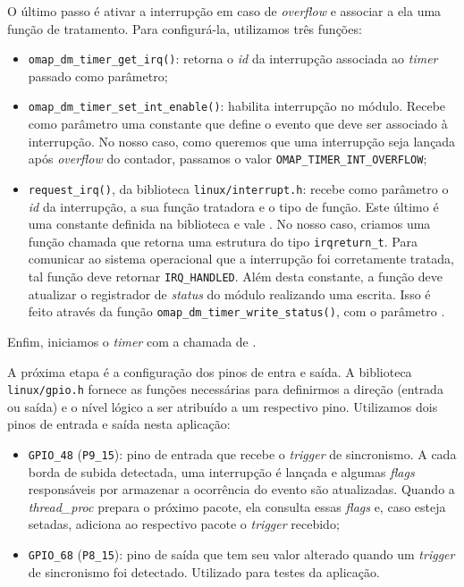 O último passo é ativar a interrupção em caso de \textit{overflow} e associar a
ela uma função de tratamento. Para configurá-la, utilizamos três funções:

\begin{itemize} \renewcommand\labelitemi{--}
  \item \texttt{omap\_dm\_timer\_get\_irq()}: retorna o \textit{id} da
  interrupção associada ao \textit{timer} passado como parâmetro;

  \item \texttt{omap\_dm\_timer\_set\_int\_enable()}: habilita interrupção no
  módulo. Recebe como parâmetro uma constante que define o evento que deve ser
  associado à interrupção. No nosso caso, como queremos que uma interrupção seja
  lançada após \textit{overflow} do contador, passamos o valor
  \texttt{OMAP\_TIMER\_INT\_OVERFLOW};

  \item \texttt{request\_irq()}, da biblioteca \texttt{linux/interrupt.h}:
  recebe como parâmetro o \textit{id} da interrupção, a sua função tratadora e
  o tipo de função. Este último é uma constante definida na biblioteca e vale
  . No nosso caso, criamos uma função chamada
   que retorna uma estrutura do tipo \texttt{irqreturn\_t}. Para comunicar ao sistema
  operacional que a interrupção foi corretamente tratada, tal função deve
  retornar \texttt{IRQ\_HANDLED}. Além desta constante, a função deve atualizar
  o registrador de \textit{status} do módulo realizando uma escrita. Isso é
  feito através da função \texttt{omap\_dm\_timer\_write\_status()}, com o
  parâmetro .
\end{itemize}
 
Enfim, iniciamos o \textit{timer} com a chamada de .

\vspace{12pt}

A próxima etapa é a configuração dos pinos de entra e saída. A biblioteca
\texttt{linux/gpio.h} fornece as funções necessárias para definirmos a direção
(entrada ou saída) e o nível lógico a ser atribuído a um respectivo pino.
Utilizamos dois pinos de entrada e saída nesta aplicação:

\begin{itemize} \renewcommand\labelitemi{--}
  \item \texttt{GPIO\_48} (\texttt{P9\_15}): pino de entrada que recebe o
  \textit{trigger} de sincronismo. A cada borda de subida detectada, uma
  interrupção é lançada e algumas \textit{flags} responsáveis por armazenar a
  ocorrência do evento são atualizadas. Quando a \textit{thread\_proc} prepara o
  próximo pacote, ela consulta essas \textit{flags} e, caso esteja setadas,
  adiciona ao respectivo pacote o \textit{trigger} recebido;

  \item \texttt{GPIO\_68} (\texttt{P8\_15}): pino de saída que tem seu valor
  alterado quando um \textit{trigger} de sincronismo foi detectado. Utilizado
  para testes da aplicação.
\end{itemize}

